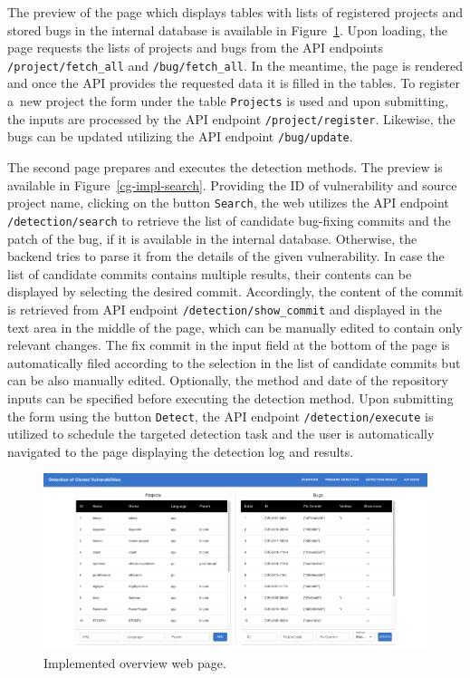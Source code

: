   The preview of the page which displays tables with lists of registered projects and stored bugs in the internal database is available
  in Figure~\ref{cg-impl-overview}. Upon loading, the page requests the lists of projects and bugs from the API
  endpoints \texttt{/project/fetch\_all} and \texttt{/bug/fetch\_all}. In the meantime, the page is rendered and once the API
  provides the requested data it is filled in the tables. To register a~new project the form under the table \texttt{Projects}
  is used and upon submitting, the inputs are processed by the API endpoint \texttt{/project/register}. Likewise, the bugs
  can be updated utilizing the API endpoint \texttt{/bug/update}.

  The second page prepares and executes the detection methods. The preview is available in Figure~\ref{cg-impl-search}.
  Providing the ID of vulnerability and source project name, clicking on the button \texttt{Search}, the web utilizes
  the API endpoint \texttt{/detection/search} to retrieve the list of candidate bug-fixing commits and the patch of the bug,
  if it is available in the internal database. Otherwise, the backend tries to parse it from the details of the given vulnerability.
  In case the list of candidate commits contains multiple results, their contents can be displayed by selecting the desired
  commit. Accordingly, the content of the commit is retrieved from API endpoint \texttt{/detection/show\_commit} and displayed
  in the text area in the middle of the page, which can be manually edited to contain only relevant changes. The fix commit
  in the input field at the bottom of the page is automatically filed according to the selection in the list of candidate commits
  but can be also manually edited. Optionally, the method and date of the repository inputs can be specified before executing
  the detection method. Upon submitting the form using the button \texttt{Detect}, the API endpoint \texttt{/detection/execute}
  is utilized to schedule the targeted detection task and the user is automatically navigated to the page displaying the detection
  log and results.

  \begin{figure}[h]
    \centering
    \includegraphics[width=1\textwidth]{obrazky-figures/cg_web_overview.png}
    \caption{Implemented overview web page.}
    \label{cg-impl-overview}
  \end{figure}

